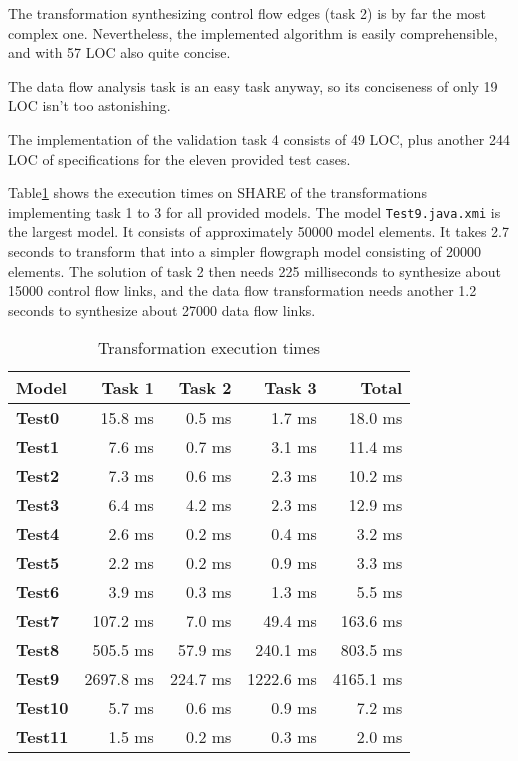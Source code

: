 \documentclass[11pt]{article}
\begin{document}
The transformation synthesizing control flow edges (task 2) is by far the most
complex one.  Nevertheless, the implemented algorithm is easily comprehensible,
and with 57 LOC also quite concise.

The data flow analysis task is an easy task anyway, so its conciseness of only
19 LOC isn't too astonishing.

The implementation of the validation task 4 consists of 49 LOC, plus another
244 LOC of specifications for the eleven provided test cases.

Table\ref{tab:eval-perf} shows the execution times on SHARE of the
transformations implementing task 1 to 3 for all provided models.  The model
\verb|Test9.java.xmi| is the largest model.  It consists of approximately 50000
model elements.  It takes 2.7 seconds to transform that into a simpler
flowgraph model consisting of 20000 elements.  The solution of task 2 then
needs 225 milliseconds to synthesize about 15000 control flow links, and the
data flow transformation needs another 1.2 seconds to synthesize about 27000
data flow links.

\begin{table}[h!]
  \centering
  \begin{tabular}{| l | r | r | r | r |}
    \hline
    \textbf{Model} & \textbf{Task 1} & \textbf{Task 2} & \textbf{Task 3} & \textbf{Total}\\
    \hline
    \textbf{Test0} & 15.8 ms & 0.5 ms & 1.7 ms & 18.0 ms\\
    \textbf{Test1} & 7.6 ms & 0.7 ms & 3.1 ms & 11.4 ms\\
    \textbf{Test2} & 7.3 ms & 0.6 ms & 2.3 ms & 10.2 ms\\
    \textbf{Test3} & 6.4 ms & 4.2 ms & 2.3 ms & 12.9 ms\\
    \textbf{Test4} & 2.6 ms & 0.2 ms & 0.4 ms & 3.2 ms\\
    \textbf{Test5} & 2.2 ms & 0.2 ms & 0.9 ms & 3.3 ms\\
    \textbf{Test6} & 3.9 ms & 0.3 ms & 1.3 ms & 5.5 ms\\
    \textbf{Test7} & 107.2 ms & 7.0 ms & 49.4 ms & 163.6 ms\\
    \textbf{Test8} & 505.5 ms & 57.9 ms & 240.1 ms & 803.5 ms\\
    \textbf{Test9} & 2697.8 ms & 224.7 ms & 1222.6 ms & 4165.1 ms\\
    \textbf{Test10} & 5.7 ms & 0.6 ms & 0.9 ms & 7.2 ms\\
    \textbf{Test11} & 1.5 ms & 0.2 ms & 0.3 ms & 2.0 ms\\
    \hline
  \end{tabular}
  \caption{Transformation execution times}
  \label{tab:eval-perf}
\end{table}





\end{document}
